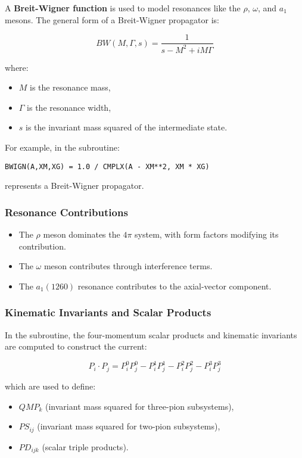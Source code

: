\documentclass[12pt]{article}
\begin{document}
A \textbf{Breit-Wigner function} is used to model resonances like the \(\rho\), \(\omega\), and \( a_1 \) mesons. The general form of a Breit-Wigner propagator is:

\begin{equation}
BW(M, \Gamma, s) = \frac{1}{s - M^2 + i M \Gamma}
\end{equation}

where:
\begin{itemize}
    \item \( M \) is the resonance mass,
    \item \( \Gamma \) is the resonance width,
    \item \( s \) is the invariant mass squared of the intermediate state.
\end{itemize}

For example, in the subroutine:
\begin{verbatim}
BWIGN(A,XM,XG) = 1.0 / CMPLX(A - XM**2, XM * XG)
\end{verbatim}
represents a Breit-Wigner propagator.

\subsubsection{Resonance Contributions}
\begin{itemize}
    \item The \(\rho\) meson dominates the \( 4\pi \) system, with form factors modifying its contribution.
    \item The \(\omega\) meson contributes through interference terms.
    \item The \( a_1(1260) \) resonance contributes to the axial-vector component.
\end{itemize}

\subsubsection{Kinematic Invariants and Scalar Products}

In the subroutine, the four-momentum scalar products and kinematic invariants are computed to construct the current:

\begin{equation}
P_i \cdot P_j = P_i^0 P_j^0 - P_i^1 P_j^1 - P_i^2 P_j^2 - P_i^3 P_j^3
\end{equation}

which are used to define:
\begin{itemize}
    \item \( QMP_k \) (invariant mass squared for three-pion subsystems),
    \item \( PS_{ij} \) (invariant mass squared for two-pion subsystems),
    \item \( PD_{ijk} \) (scalar triple products).
\end{itemize}
\end{document}
